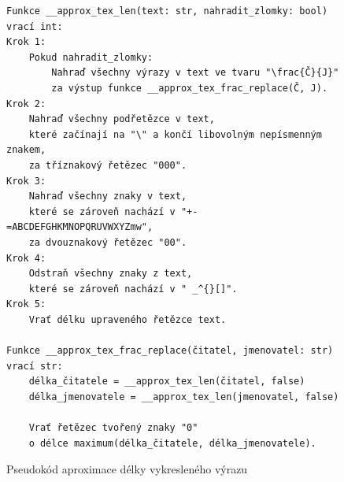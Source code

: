 \documentclass[FM]{tulthesis}
\begin{document}
	\begin{figure}[ht]
		\begin{lstlisting}[language=Pseudo1]
Funkce __approx_tex_len(text: str, nahradit_zlomky: bool) vrací int:
Krok 1:
	Pokud nahradit_zlomky:
		Nahraď všechny výrazy v text ve tvaru "\frac{Č}{J}"
		za výstup funkce __approx_tex_frac_replace(Č, J).
Krok 2:
	Nahraď všechny podřetězce v text,
	které začínají na "\" a končí libovolným nepísmenným znakem,
	za tříznakový řetězec "000".
Krok 3:
	Nahraď všechny znaky v text,
	které se zároveň nachází v "+-=ABCDEFGHKMNOPQRUVWXYZmw",
	za dvouznakový řetězec "00".
Krok 4:
	Odstraň všechny znaky z text,
	které se zároveň nachází v " _^{}[]".
Krok 5:
	Vrať délku upraveného řetězce text.
	
Funkce __approx_tex_frac_replace(čitatel, jmenovatel: str) vrací str:
	délka_čitatele = __approx_tex_len(čitatel, false)
	délka_jmenovatele = __approx_tex_len(jmenovatel, false)

	Vrať řetězec tvořený znaky "0"
	o délce maximum(délka_čitatele, délka_jmenovatele).
		\end{lstlisting}
		\caption{Pseudokód aproximace délky vykresleného výrazu}
	\end{figure}
	
\end{document}
